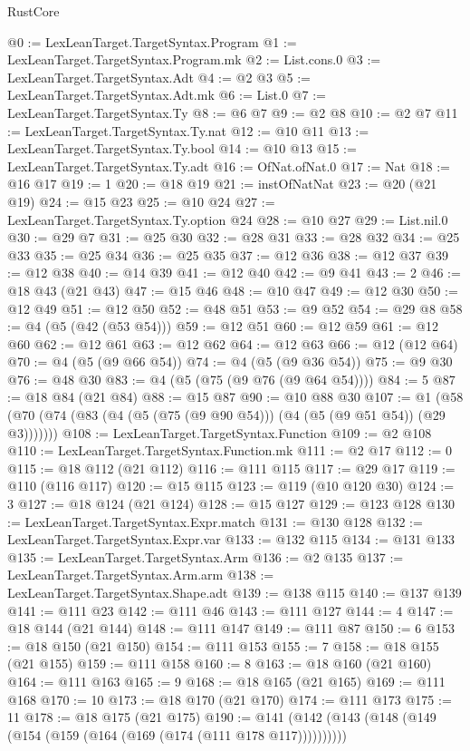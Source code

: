 \begin{lexlean}{RustCore}
\begin{coremodule}
@0 := LexLeanTarget.TargetSyntax.Program
@1 := LexLeanTarget.TargetSyntax.Program.mk
@2 := List.cons.{0}
@3 := LexLeanTarget.TargetSyntax.Adt
@4 := @2 @3
@5 := LexLeanTarget.TargetSyntax.Adt.mk
@6 := List.{0}
@7 := LexLeanTarget.TargetSyntax.Ty
@8 := @6 @7
@9 := @2 @8
@10 := @2 @7
@11 := LexLeanTarget.TargetSyntax.Ty.nat
@12 := @10 @11
@13 := LexLeanTarget.TargetSyntax.Ty.bool
@14 := @10 @13
@15 := LexLeanTarget.TargetSyntax.Ty.adt
@16 := OfNat.ofNat.{0}
@17 := Nat
@18 := @16 @17
@19 := 1
@20 := @18 @19
@21 := instOfNatNat
@23 := @20 (@21 @19)
@24 := @15 @23
@25 := @10 @24
@27 := LexLeanTarget.TargetSyntax.Ty.option @24
@28 := @10 @27
@29 := List.nil.{0}
@30 := @29 @7
@31 := @25 @30
@32 := @28 @31
@33 := @28 @32
@34 := @25 @33
@35 := @25 @34
@36 := @25 @35
@37 := @12 @36
@38 := @12 @37
@39 := @12 @38
@40 := @14 @39
@41 := @12 @40
@42 := @9 @41
@43 := 2
@46 := @18 @43 (@21 @43)
@47 := @15 @46
@48 := @10 @47
@49 := @12 @30
@50 := @12 @49
@51 := @12 @50
@52 := @48 @51
@53 := @9 @52
@54 := @29 @8
@58 := @4 (@5 (@42 (@53 @54)))
@59 := @12 @51
@60 := @12 @59
@61 := @12 @60
@62 := @12 @61
@63 := @12 @62
@64 := @12 @63
@66 := @12 (@12 @64)
@70 := @4 (@5 (@9 @66 @54))
@74 := @4 (@5 (@9 @36 @54))
@75 := @9 @30
@76 := @48 @30
@83 := @4 (@5 (@75 (@9 @76 (@9 @64 @54))))
@84 := 5
@87 := @18 @84 (@21 @84)
@88 := @15 @87
@90 := @10 @88 @30
@107 := @1 (@58 (@70 (@74 (@83 (@4 (@5 (@75 (@9 @90 @54))) (@4 (@5 (@9 @51 @54)) (@29 @3)))))))
@108 := LexLeanTarget.TargetSyntax.Function
@109 := @2 @108
@110 := LexLeanTarget.TargetSyntax.Function.mk
@111 := @2 @17
@112 := 0
@115 := @18 @112 (@21 @112)
@116 := @111 @115
@117 := @29 @17
@119 := @110 (@116 @117)
@120 := @15 @115
@123 := @119 (@10 @120 @30)
@124 := 3
@127 := @18 @124 (@21 @124)
@128 := @15 @127
@129 := @123 @128
@130 := LexLeanTarget.TargetSyntax.Expr.match
@131 := @130 @128
@132 := LexLeanTarget.TargetSyntax.Expr.var
@133 := @132 @115
@134 := @131 @133
@135 := LexLeanTarget.TargetSyntax.Arm
@136 := @2 @135
@137 := LexLeanTarget.TargetSyntax.Arm.arm
@138 := LexLeanTarget.TargetSyntax.Shape.adt
@139 := @138 @115
@140 := @137 @139
@141 := @111 @23
@142 := @111 @46
@143 := @111 @127
@144 := 4
@147 := @18 @144 (@21 @144)
@148 := @111 @147
@149 := @111 @87
@150 := 6
@153 := @18 @150 (@21 @150)
@154 := @111 @153
@155 := 7
@158 := @18 @155 (@21 @155)
@159 := @111 @158
@160 := 8
@163 := @18 @160 (@21 @160)
@164 := @111 @163
@165 := 9
@168 := @18 @165 (@21 @165)
@169 := @111 @168
@170 := 10
@173 := @18 @170 (@21 @170)
@174 := @111 @173
@175 := 11
@178 := @18 @175 (@21 @175)
@190 := @141 (@142 (@143 (@148 (@149 (@154 (@159 (@164 (@169 (@174 (@111 @178 @117))))))))))

\end{coremodule}
\end{lexlean}
